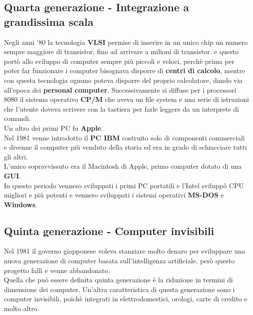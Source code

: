 \documentclass[12pt]{report}
\begin{document}
		\subsection{Quarta generazione - Integrazione a grandissima scala}
		Negli anni '80 la tecnologia \textbf{VLSI} permise di inserire in un unico chip un numero sempre maggiore di transistor, fino ad arrivare a milioni di transistor. e questo portò allo sviluppo di computer sempre più piccoli e veloci, perchè prima per poter far funzionare i computer bisognava disporre di \textbf{centri di calcolo}, mentre con questa tecnologia ognuno poteva disporre del proprio calcolatore, dando via all'epoca dei \textbf{personal computer}. Successivamente si diffuse per i processori 8080 il sistema operativo \textbf{CP/M} che aveva un file system e una serie di istruzioni che l'utente doveva scrivere con la tastiera per farle leggere da un interprete di comandi. \\
		Un altro dei primi PC fu \textbf{Apple}. \\
		Nel 1981 venne introdotto il \textbf{PC IBM} costruito solo di componenti commerciali e divenne il computer più venduto della storia ed era in grado di schiacciare tutti gli altri. \\
		L'unico sopravvissuto era il Macintosh di Apple, primo computer dotato di una \textbf{GUI}. \\
		In questo periodo vennero sviluppati i primi PC portatili e l'Intel sviluppò CPU migliori e più potenti e vennero sviluppati i sistemi operativi \textbf{MS-DOS} e \textbf{Windows}.
		\subsection{Quinta generazione - Computer invisibili}
		Nel 1981 il governo giapponese voleva stanziare molto denaro per sviluppare una nuova generazione di computer basata sull'intelligenza artificiale, però questo progetto fallì e venne abbandonato. \\
		Quella che può essere definita quinta generazione è la riduzione in termini di dimensione dei computer. Un'altra caratteristica di questa generazione sono i computer invisibili, poichè integrati in elettrodomestici, orologi, carte di credito e molto altro.
\end{document}
